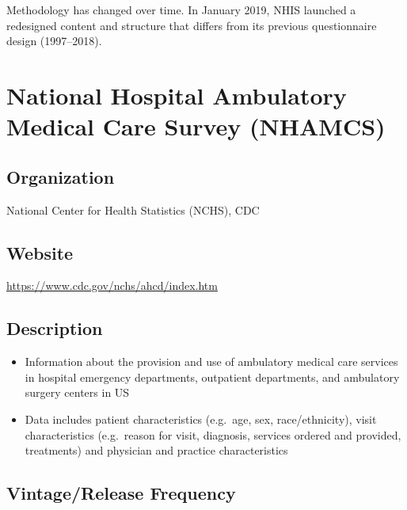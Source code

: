 \documentclass[
]{book}
\providecommand{\tightlist}{%
  \setlength{\itemsep}{0pt}\setlength{\parskip}{0pt}}
\begin{document}
Methodology has changed over time. In January 2019, NHIS launched a redesigned content and structure that differs from its previous questionnaire design (1997--2018).

\mainmatter

\hypertarget{national-hospital-ambulatory-medical-care-survey-nhamcs}{%
\chapter{National Hospital Ambulatory Medical Care Survey (NHAMCS)}\label{national-hospital-ambulatory-medical-care-survey-nhamcs}}

\hypertarget{organization-51}{%
\section{Organization}\label{organization-51}}

National Center for Health Statistics (NCHS), CDC

\hypertarget{website-51}{%
\section{Website}\label{website-51}}

\url{https://www.cdc.gov/nchs/ahcd/index.htm}

\hypertarget{description-51}{%
\section{Description}\label{description-51}}

\begin{itemize}
\tightlist
\item
  Information about the provision and use of ambulatory medical care services in hospital emergency departments, outpatient departments, and ambulatory surgery centers in US
\item
  Data includes patient characteristics (e.g.~age, sex, race/ethnicity), visit characteristics (e.g.~reason for visit, diagnosis, services ordered and provided, treatments) and physician and practice characteristics
\end{itemize}

\hypertarget{vintagerelease-frequency-51}{%
\section{Vintage/Release Frequency}\label{vintagerelease-frequency-51}}
\end{document}
